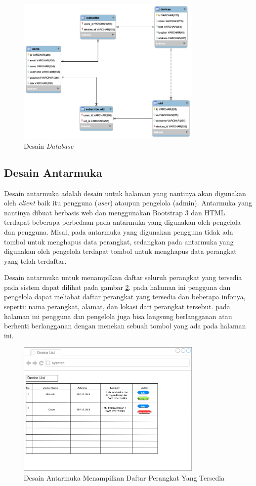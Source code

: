         	\begin{figure}[H]
        		\centering
        		\includegraphics[width=9cm]{Images/C-3/desaindb.png}
        		\caption{Desain \textit{Database}}
        		\label{desain:desaindatabase}
        	\end{figure}
        	
		\subsection{Desain Antarmuka}
			Desain antarmuka adalah desain untuk halaman yang nantinya akan digunakan oleh \textit{client} baik itu pengguna (\textit{user}) ataupun pengelola (admin). Antarmuka yang nantinya dibuat berbasis web dan  menggunakan Bootstrap 3 dan HTML. terdapat beberapa perbedaan pada antarmuka yang digunakan oleh pengelola dan pengguna. Misal, pada antarmuka yang digunakan pengguna tidak ada tombol untuk menghapus data perangkat, sedangkan pada antarmuka yang digunakan oleh pengelola terdapat tombol untuk menghapus data perangkat yang telah terdaftar.
			
			Desain antarmuka untuk menampilkan daftar seluruh perangkat yang tersedia pada sistem dapat dilihat pada gambar \ref{desain:antarmuka1}. pada halaman ini pengguna dan pengelola dapat meliahat daftar perangkat yang tersedia dan beberapa infonya, seperti: nama perangkat, alamat, dan lokasi dari perangkat tersebut. pada halaman ini pengguna dan pengelola juga bisa langsung berlangganan atau berhenti berlangganan dengan menekan sebuah tombol yang ada pada halaman ini.
        	\begin{figure}[H]
        		\centering
        		\includegraphics[width=9cm]{Images/C-3/antarmuka1.png}
        		\caption{Desain Antarmuka Menampilkan Daftar Perangkat Yang Tersedia}
        		\label{desain:antarmuka1}
        	\end{figure}
        
